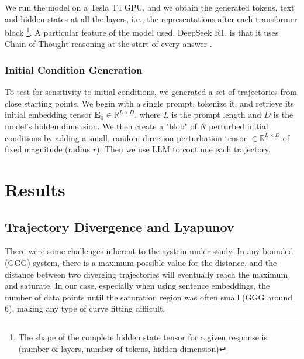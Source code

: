 \documentclass[a4paper,12pt]{article}
\begin{document}
We run the model on a Tesla T4 GPU, and we obtain the generated tokens, text and hidden states at all the layers, i.e., the representations after each transformer block \footnote{The shape of the complete hidden state tensor for a given response is (number of layers, number of tokens, hidden dimension)}. A particular feature of the model used, DeepSeek R1, is that it uses Chain-of-Thought reasoning at the start of every answer \cite{deepseekR1}.

\subsubsection{Initial Condition Generation}
\label{subsec:init_cond_gen}
To test for sensitivity to initial conditions, we generated a set of trajectories from close starting points. We begin with a single prompt, tokenize it, and retrieve its initial embedding tensor $\mathbf{E}_0 \in \mathbb{R}^{L \times D}$, where $L$ is the prompt length and $D$ is the model's hidden dimension. We then create a "blob" of $N$ perturbed initial conditions by adding a small, random direction perturbation tensor $\in \mathbb{R}^{L \times D}$ of fixed magnitude (radius $r$). Then we use LLM to continue each trajectory.

\section{Results}
\label{sec:results}

\subsection{Trajectory Divergence and Lyapunov} \label{res:lyapunov} %

There were some challenges inherent to the system under study. In any bounded (GGG) system, there is a maximum possible value for the distance, and the distance between two diverging trajectories will eventually reach the maximum and saturate. In our case, especially when using sentence embeddings, the number of data points until the saturation region was often small (GGG around 6), making any type of curve fitting difficult.
\end{document}
